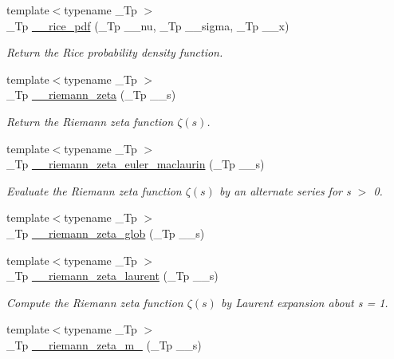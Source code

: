 \begin{DoxyCompactItemize}
\item 
{\footnotesize template$<$typename \+\_\+\+Tp $>$ }\\\+\_\+\+Tp \hyperlink{namespacestd_1_1____detail_a571f37fdf793a91985073a58a873e731}{\+\_\+\+\_\+rice\+\_\+pdf} (\+\_\+\+Tp \+\_\+\+\_\+nu, \+\_\+\+Tp \+\_\+\+\_\+sigma, \+\_\+\+Tp \+\_\+\+\_\+x)
\begin{DoxyCompactList}\small\item\em Return the Rice probability density function. \end{DoxyCompactList}\item 
{\footnotesize template$<$typename \+\_\+\+Tp $>$ }\\\+\_\+\+Tp \hyperlink{namespacestd_1_1____detail_a2be77d9bdd1b8b463be44a0e7558bc2a}{\+\_\+\+\_\+riemann\+\_\+zeta} (\+\_\+\+Tp \+\_\+\+\_\+s)
\begin{DoxyCompactList}\small\item\em Return the Riemann zeta function $ \zeta(s) $. \end{DoxyCompactList}\item 
{\footnotesize template$<$typename \+\_\+\+Tp $>$ }\\\+\_\+\+Tp \hyperlink{namespacestd_1_1____detail_a84ac805996c4eeb8cbfa181e6e47f0ae}{\+\_\+\+\_\+riemann\+\_\+zeta\+\_\+euler\+\_\+maclaurin} (\+\_\+\+Tp \+\_\+\+\_\+s)
\begin{DoxyCompactList}\small\item\em Evaluate the Riemann zeta function $ \zeta(s) $ by an alternate series for s $>$ 0. \end{DoxyCompactList}\item 
{\footnotesize template$<$typename \+\_\+\+Tp $>$ }\\\+\_\+\+Tp \hyperlink{namespacestd_1_1____detail_ab3542ea44b34da3d4865ed9a014e2951}{\+\_\+\+\_\+riemann\+\_\+zeta\+\_\+glob} (\+\_\+\+Tp \+\_\+\+\_\+s)
\item 
{\footnotesize template$<$typename \+\_\+\+Tp $>$ }\\\+\_\+\+Tp \hyperlink{namespacestd_1_1____detail_a5aa95e3482a58e4bd0a7f8395f88fe1c}{\+\_\+\+\_\+riemann\+\_\+zeta\+\_\+laurent} (\+\_\+\+Tp \+\_\+\+\_\+s)
\begin{DoxyCompactList}\small\item\em Compute the Riemann zeta function $ \zeta(s) $ by Laurent expansion about s = 1. \end{DoxyCompactList}\item 
{\footnotesize template$<$typename \+\_\+\+Tp $>$ }\\\+\_\+\+Tp \hyperlink{namespacestd_1_1____detail_a174bfa28eeb176b90ff251b5affbecb2}{\+\_\+\+\_\+riemann\+\_\+zeta\+\_\+m\+\_} (\+\_\+\+Tp \+\_\+\+\_\+s)

\end{DoxyCompactItemize}
